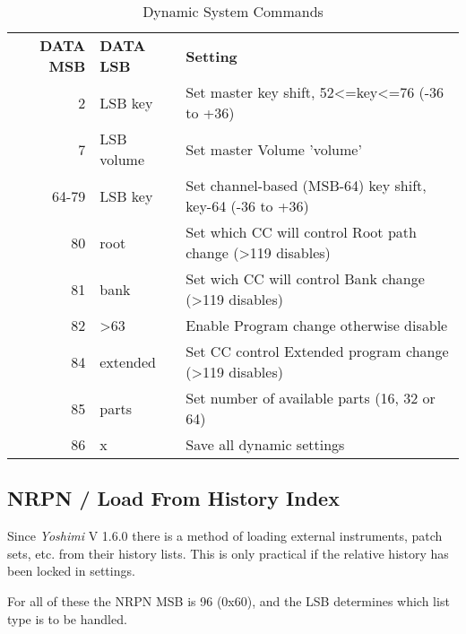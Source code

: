    \begin{table}[H]
      \centering
      \caption{Dynamic System Commands}
      \label{table:dynamic_system_commands}
      \begin{tabular}{r l l}

\textbf{DATA MSB} & \textbf{DATA LSB} & \textbf{Setting} \\

  2 & LSB key       & Set master key shift, 52\textless=key\textless=76 (-36 to +36) \\
  7 & LSB volume    & Set master Volume 'volume' \\
  64-79 & LSB key   & Set channel-based (MSB-64) key shift, key-64 (-36 to +36) \\
  80    & root      & Set which CC will control Root path change (\textgreater119 disables) \\
  81    & bank      & Set wich CC will control Bank change (\textgreater119 disables) \\
  82    & \textgreater63       & Enable Program change otherwise disable \\
  84    & extended  & Set CC control Extended program change (\textgreater119 disables) \\
  85    & parts     & Set number of available parts (16, 32 or 64) \\
  86    & x         & Save all dynamic settings \\
      \end{tabular}
   \end{table}

\subsection{NRPN / Load From History Index}
\label{subsection:nrpns_load_from_history_index}
   Since \textsl{Yoshimi} V 1.6.0 there is a method of loading external
   instruments, patch sets, etc. from their history lists. This is only
   practical if the relative history has been locked in settings.

   For all of these the NRPN MSB is 96 (0x60), and the LSB determines which
   list type is to be handled.

